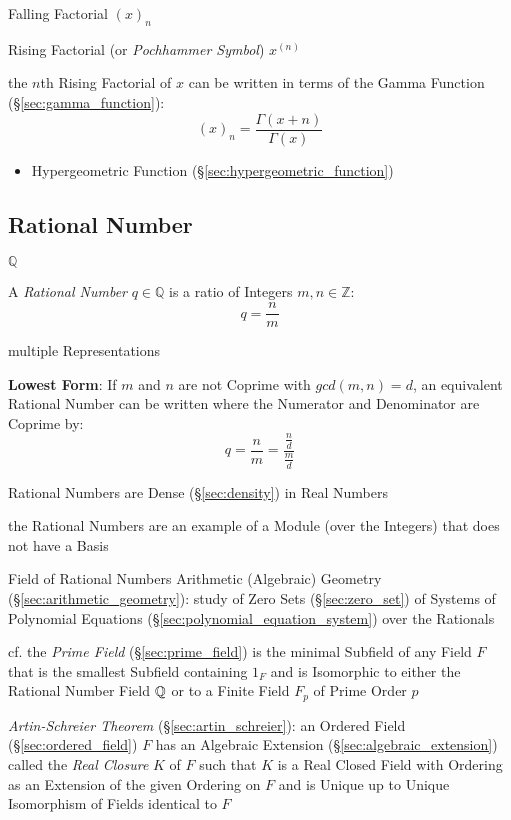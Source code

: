 Falling Factorial $(x)_n$

Rising Factorial (or \emph{Pochhammer Symbol}) $x^{(n)}$

the $n$th Rising Factorial of $x$ can be written in terms of the Gamma Function
(\S\ref{sec:gamma_function}):
\[
  (x)_n = \frac{\Gamma(x+n)}{\Gamma(x)}
\]

\begin{itemize}
  \item Hypergeometric Function (\S\ref{sec:hypergeometric_function})
\end{itemize}



\subsection{Rational Number}\label{sec:rational}

$\mathbb{Q}$

A \emph{Rational Number} $q \in \mathbb{Q}$ is a ratio of Integers
$m,n \in \mathbb{Z}$:
\[
  q = \frac{n}{m}
\]

multiple Representations

\textbf{Lowest Form}: If $m$ and $n$ are not Coprime with $gcd (m,n) =
d$, an equivalent Rational Number can be written where the Numerator
and Denominator are Coprime by:
\[
  q = \frac{n}{m} = \frac{\frac{n}{d}}{\frac{m}{d}}
\]

Rational Numbers are Dense (\S\ref{sec:density}) in Real Numbers

the Rational Numbers are an example of a Module (over the Integers) that does
not have a Basis

Field of Rational Numbers \fist Arithmetic (Algebraic) Geometry
(\S\ref{sec:arithmetic_geometry}): study of Zero Sets (\S\ref{sec:zero_set}) of
Systems of Polynomial Equations (\S\ref{sec:polynomial_equation_system}) over
the Rationals

\fist cf. the \emph{Prime Field} (\S\ref{sec:prime_field}) is the minimal
Subfield of any Field $F$ that is the smallest Subfield containing $1_F$ and is
Isomorphic to either the Rational Number Field $\mathbb{Q}$ or to a Finite Field
$F_p$ of Prime Order $p$

\emph{Artin-Schreier Theorem} (\S\ref{sec:artin_schreier}):
an Ordered Field (\S\ref{sec:ordered_field}) $F$ has an Algebraic Extension
(\S\ref{sec:algebraic_extension}) called the \emph{Real Closure} $K$ of $F$
such that $K$ is a Real Closed Field with Ordering as an Extension of the given
Ordering on $F$ and is Unique up to Unique Isomorphism of Fields identical to
$F$

